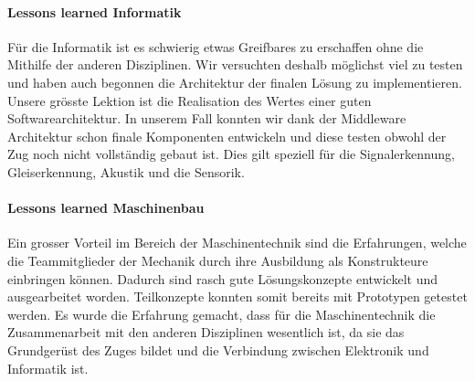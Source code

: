 \documentclass[../../main.tex]{subfiles}
\begin{document}
\paragraph{Lessons learned Informatik}
Für die Informatik ist es schwierig etwas Greifbares zu erschaffen ohne die Mithilfe der anderen Disziplinen. Wir
versuchten deshalb möglichst viel zu testen und haben auch begonnen die Architektur der finalen Lösung zu
implementieren. Unsere grösste Lektion ist die Realisation des Wertes einer guten Softwarearchitektur. In unserem Fall konnten wir
dank der
Middleware Architektur schon finale Komponenten entwickeln und diese testen obwohl der Zug noch nicht vollständig gebaut
ist. Dies gilt speziell für die Signalerkennung, Gleiserkennung, Akustik und die Sensorik.

\paragraph{Lessons learned Maschinenbau}
Ein grosser Vorteil im Bereich der Maschinentechnik sind die Erfahrungen, welche die Teammitglieder der Mechanik durch ihre Ausbildung als Konstrukteure einbringen können. Dadurch sind rasch gute Lösungskonzepte entwickelt und ausgearbeitet worden. Teilkonzepte konnten somit bereits mit Prototypen getestet werden. Es wurde die Erfahrung gemacht, dass für die Maschinentechnik die Zusammenarbeit mit den anderen Disziplinen wesentlich ist, da sie das Grundgerüst des Zuges bildet und die Verbindung zwischen Elektronik und Informatik ist.
\end{document}
